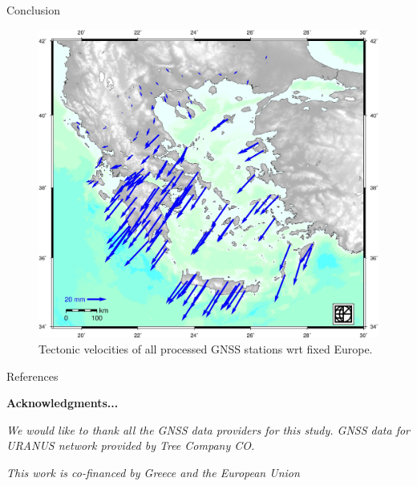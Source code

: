 \documentclass[final,a0,portrait]{beamer}
\newlength{\onecolwid}
\begin{document}
\begin{frame}[t]
\begin{columns}[t]
\begin{column}{\onecolwid}
\begin{block}{Conclusion}
{}
\begin{figure}
    \includegraphics[width=.9\onecolwid]{testvel.jpg}
    \caption{Tectonic velocities of all processed GNSS stations wrt fixed Europe.}
    \label{fig:vels}
\end{figure}
\end{block}


\begin{block}{References}

\nocite{*} %
\footnotesize{
\vspace{0.75in}}

\textbf{Acknowledgments...}
\par\textit{\footnotesize We would like to thank all the GNSS data providers for this study.
GNSS data for URANUS network provided by Tree Company CO.}
\par\textit{\footnotesize This work is co-financed by Greece and the European Union}
\end{block}



\end{column}
\end{columns}
\end{frame}
\end{document}
